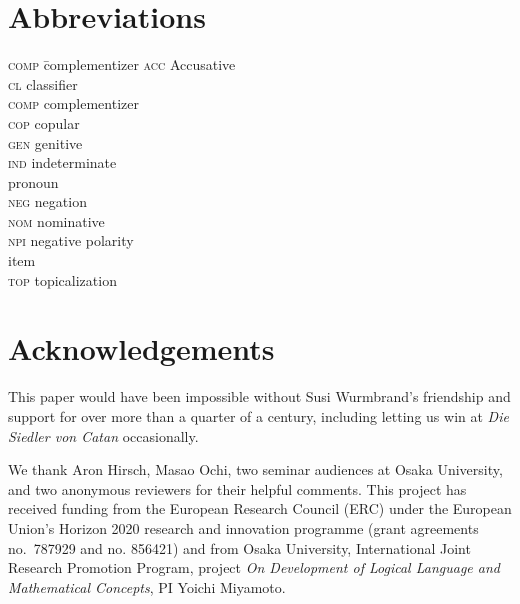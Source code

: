 \documentclass[output=paper]{langscibook}
\begin{document}
\section*{Abbreviations}
\begin{multicols}{3}
\begin{tabbing}
\textsc{comp} \hspace{.5ex}\= complementizer\kill
\textsc{acc}  \> Accusative       \\
\textsc{cl}   \> classifier      \\
\textsc{comp} \> complementizer    \\
\textsc{cop}  \> copular        \\
\textsc{gen}  \> genitive       \\  
\textsc{ind}  \> indeterminate \\ \> pronoun         \\
\textsc{neg}  \> negation               \\
\textsc{nom}  \> nominative             \\
\textsc{npi}  \> negative polarity \\ \> item \\
\textsc{top}  \> topicalization   
\end{tabbing}
\end{multicols}

\section*{Acknowledgements}

This paper would have been impossible without Susi Wurmbrand's friendship and support for over more than a quarter of a century, including letting us win at \emph{Die Siedler von Catan} occasionally.

We thank Aron Hirsch, Masao Ochi, two seminar audiences at Osaka University, and two anonymous reviewers for their helpful comments.  This project has received funding from the European Research Council (ERC) under the European Union's Horizon 2020 research and innovation programme (grant agreements no.\ 787929 and no. 856421) and from Osaka University, International Joint Research Promotion Program, project \emph{On Development of Logical Language and Mathematical Concepts}, PI Yoichi Miyamoto.

\printbibliography[heading=subbibliography,notkeyword=this]
\end{document}
